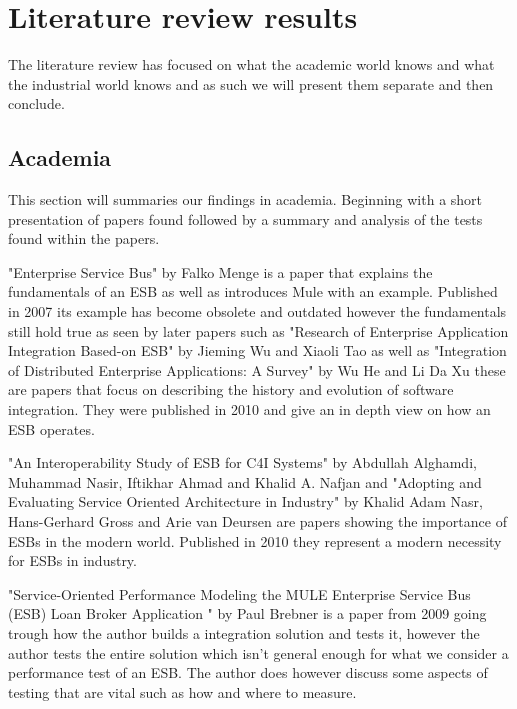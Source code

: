 ﻿\section{Literature review results}
\label{sec:litrev}

The literature review has focused on what the academic world knows and what the industrial world knows and as such we will present them separate and then conclude.

\subsection{Academia}
This section will summaries our findings in academia. Beginning with a short presentation of papers found followed by a summary and analysis of the tests found within the papers.


"Enterprise Service Bus"\cite{falko07} by Falko Menge is a paper that explains the fundamentals of an ESB as well as introduces Mule with an example. Published in 2007 its example has become obsolete and outdated however the fundamentals still hold true as seen by later papers such as "Research of Enterprise Application Integration Based-on ESB" \cite{Jieming2010} by Jieming Wu and Xiaoli Tao as well as "Integration of Distributed Enterprise Applications: A Survey" \cite{HeIntegration} by Wu He and Li Da Xu these are papers that focus on describing the history and evolution of software integration. They were published in 2010 and give an in depth view on how an ESB  operates.


"An Interoperability  Study  of ESB for C4I  Systems" \cite{Alghamdi2010} by Abdullah Alghamdi, Muhammad Nasir, Iftikhar Ahmad and Khalid A. Nafjan and  "Adopting and Evaluating Service Oriented Architecture in Industry" by Khalid Adam Nasr, Hans-Gerhard Gross and Arie van Deursen are papers showing the importance of ESBs in the modern world. Published in 2010 they represent a modern necessity for ESBs in industry.


"Service-Oriented Performance Modeling the MULE Enterprise Service Bus (ESB) Loan Broker Application " \cite{Brebner2009} by Paul Brebner is a paper from 2009 going trough how the author builds a integration solution and tests it, however the author tests the entire solution which isn't general enough for what we consider a performance test of an ESB. The author does however discuss some aspects of testing that are vital such as how and where to measure.

